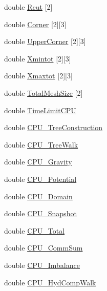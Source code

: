 \begin{DoxyCompactItemize}
double \hyperlink{structglobal__data__all__processes_aeb7ceb2f4d86465e1febbfad5fa849d6}{Rcut} \mbox{[}2\mbox{]}
\item 
double \hyperlink{structglobal__data__all__processes_a5ffb63ff788ca6eee831b5d4d0d9e150}{Corner} \mbox{[}2\mbox{]}\mbox{[}3\mbox{]}
\item 
double \hyperlink{structglobal__data__all__processes_a2a0fb0d1cda3309f002d1c0984209111}{UpperCorner} \mbox{[}2\mbox{]}\mbox{[}3\mbox{]}
\item 
double \hyperlink{structglobal__data__all__processes_a767b48fe7db038566f36edbb935d56f8}{Xmintot} \mbox{[}2\mbox{]}\mbox{[}3\mbox{]}
\item 
double \hyperlink{structglobal__data__all__processes_a3818f3c9b2979834f6938c7f18b39b0e}{Xmaxtot} \mbox{[}2\mbox{]}\mbox{[}3\mbox{]}
\item 
double \hyperlink{structglobal__data__all__processes_a1d2411089720f3ad0b8a294f5a693475}{TotalMeshSize} \mbox{[}2\mbox{]}
\item 
double \hyperlink{structglobal__data__all__processes_accf0e0ec1acab3f51f583470910049d2}{TimeLimitCPU}
\item 
double \hyperlink{structglobal__data__all__processes_ac9eb650a8550b48eb464b6a0a8629a27}{CPU\_\-TreeConstruction}
\item 
double \hyperlink{structglobal__data__all__processes_acf5e983357d7be116cd6663958e5a149}{CPU\_\-TreeWalk}
\item 
double \hyperlink{structglobal__data__all__processes_a27dce58feba6ff0e933ed6f24f857168}{CPU\_\-Gravity}
\item 
double \hyperlink{structglobal__data__all__processes_ab5f1e056cdaa2562ec2bd3945f634d73}{CPU\_\-Potential}
\item 
double \hyperlink{structglobal__data__all__processes_a786736d9e91341733e286f6e03ab26a5}{CPU\_\-Domain}
\item 
double \hyperlink{structglobal__data__all__processes_a4b533ec2fc1af7ee057eaa5805a65a7a}{CPU\_\-Snapshot}
\item 
double \hyperlink{structglobal__data__all__processes_a3d87cd9a94ce540341d4fb713b253c9e}{CPU\_\-Total}
\item 
double \hyperlink{structglobal__data__all__processes_a41ab81d126219e1ff8119f8400428216}{CPU\_\-CommSum}
\item 
double \hyperlink{structglobal__data__all__processes_a94e4eed16c5b353ec3c3c9ce380ec96a}{CPU\_\-Imbalance}
\item 
double \hyperlink{structglobal__data__all__processes_a918e3d80cf4fdaf22a803f4014588ad4}{CPU\_\-HydCompWalk}

\end{DoxyCompactItemize}
